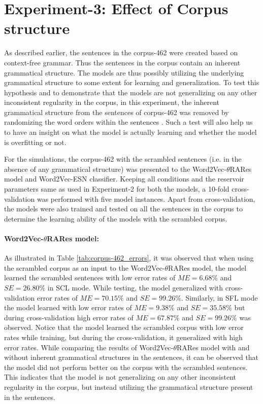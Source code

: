 \section{Experiment-3: Effect of Corpus structure} 

As described earlier, the sentences in the corpus-462 were created based on context-free grammar. Thus the sentences in the corpus contain an inherent grammatical structure. The models are thus possibly utilizing the underlying grammatical structure to some extent for learning and generalization. To test this hypothesis and to demonstrate that the models are not generalizing on any other inconsistent regularity in the corpus, in this experiment, the inherent grammatical structure from the sentences of corpus-462 was removed by randomizing the word orders within the sentences \cite{xavier:2013:RT}. Such a test will also help us to have an insight on what the model is actually learning and whether the model is overfitting or not. 

For the simulations, the corpus-462 with the scrambled sentences (i.e. in the absence of any grammatical structure) was presented to the Word2Vec-$\theta$RARes model and Word2Vec-ESN classifier. Keeping all conditions and the reservoir parameters same as used in Experiment-2 for both the models, a 10-fold cross-validation was performed with five model instances. Apart from cross-validation, the models were also trained and tested on all the sentences in the corpus to determine the learning ability of the models with the scrambled corpus.

\paragraph{Word2Vec-$\theta$RARes model:}

As illustrated in Table \ref{tab:corpus-462_errors}, it was observed that when using the scrambled corpus as an input to the Word2Vec-$\theta$RARes model, the model learned the scrambled sentences with low error rates of $ME = 6.68 \%$ and $SE = 26.80 \%$ in SCL mode. While testing, the model generalized with cross-validation error rates of $ME = 70.15 \% $ and $SE = 99.26 \%$. Similarly, in SFL mode the model learned with low error rates of $ME = 9.38 \%$ and $SE = 35.58 \%$  but during cross-validation high error rates of $ME = 67.87 \%$ and $SE = 99.26 \% $ was observed. Notice that the model learned the scrambled corpus with low error rates while training, but during the cross-validation, it generalized with high error rates. While comparing the results of Word2Vec-$\theta$RARes model with and without inherent grammatical structures in the sentences, it can be observed that the model did not perform better on the corpus with the scrambled sentences. This indicates that the model is not generalizing on any other inconsistent regularity in the corpus, but instead utilizing the grammatical structure present in the sentences.



